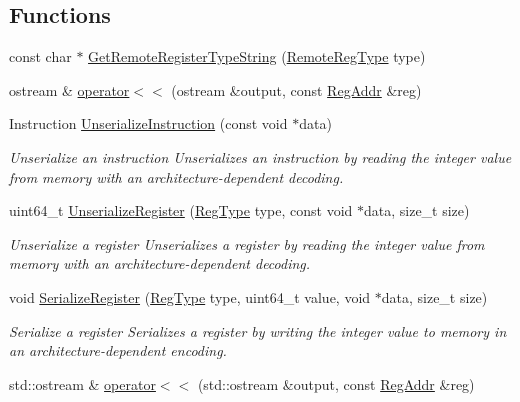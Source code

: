 \subsection*{Functions}
\begin{DoxyCompactItemize}
\item 
const char $\ast$ \hyperlink{namespace_simulator_a9c970ee2ae9969dc3cd1b6aa88916b5d}{Get\+Remote\+Register\+Type\+String} (\hyperlink{namespace_simulator_aac96aab43eac55fb7f08383889feb2d8}{Remote\+Reg\+Type} type)
\item 
ostream \& \hyperlink{namespace_simulator_adc7a77459220b9a30df7261db14c6026}{operator$<$$<$} (ostream \&output, const \hyperlink{struct_simulator_1_1_reg_addr}{Reg\+Addr} \&reg)
\item 
Instruction \hyperlink{namespace_simulator_a62ae125de2c67d20338442f34d782ce8}{Unserialize\+Instruction} (const void $\ast$data)
\begin{DoxyCompactList}\small\item\em Unserialize an instruction Unserializes an instruction by reading the integer value from memory with an architecture-\/dependent decoding. \end{DoxyCompactList}\item 
uint64\+\_\+t \hyperlink{namespace_simulator_afb231dc2ba9490c5439c1c13719ffda6}{Unserialize\+Register} (\hyperlink{namespace_simulator_ab86b74f4b95732ea63178d829b189acb}{Reg\+Type} type, const void $\ast$data, size\+\_\+t size)
\begin{DoxyCompactList}\small\item\em Unserialize a register Unserializes a register by reading the integer value from memory with an architecture-\/dependent decoding. \end{DoxyCompactList}\item 
void \hyperlink{namespace_simulator_a0807c908a0aab9a01b6d03d530dc53bf}{Serialize\+Register} (\hyperlink{namespace_simulator_ab86b74f4b95732ea63178d829b189acb}{Reg\+Type} type, uint64\+\_\+t value, void $\ast$data, size\+\_\+t size)
\begin{DoxyCompactList}\small\item\em Serialize a register Serializes a register by writing the integer value to memory in an architecture-\/dependent encoding. \end{DoxyCompactList}\item 
std\+::ostream \& \hyperlink{namespace_simulator_ae44ac35f4fed2fdc26eacc8b20d70e49}{operator$<$$<$} (std\+::ostream \&output, const \hyperlink{struct_simulator_1_1_reg_addr}{Reg\+Addr} \&reg)

\end{DoxyCompactItemize}
